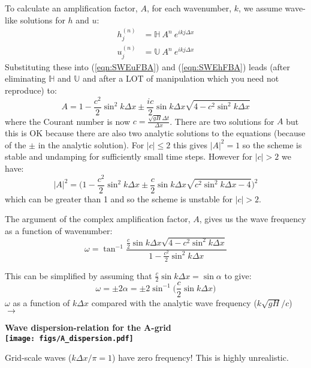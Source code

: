 To calculate an amplification factor, $A$, for each wavenumber, $k$, we assume wave-like solutions for $h$ and $u$:
\begin{align}
h_j^{(n)} &= \mathbb{H}~ A^n~ e^{ikj\Delta x}\\
u_j^{(n)} &= \mathbb{U}~ A^n~ e^{ikj\Delta x}
\end{align}
Substituting these into (\ref{eqn:SWEuFBA}) and (\ref{eqn:SWEhFBA}) leads (after eliminating $\mathbb{H}$ and $\mathbb{U}$ and after a LOT of manipulation which you need not reproduce) to:
\begin{equation}
A = 1 - \frac{c^2}{2}\sin^2 k\Delta x \pm \frac{ic}{2}\sin k\Delta x \sqrt{4 - c^2 \sin^2 k\Delta x}
\end{equation}
where the Courant number is now $c=\frac{\sqrt{gH}\Delta t}{\Delta x}$. There are two solutions for $A$ but this is OK because there are also two analytic solutions to the equations (because of the $\pm$ in the analytic solution). For $|c|\le 2$ this gives $|A|^2=1$ so the scheme is stable and undamping for sufficiently small time steps. However for $|c|>2$ we have:
\begin{equation*}
|A|^2 = \biggl(
1 - \frac{c^2}{2}\sin^2 k\Delta x \pm \frac{c}{2}\sin k\Delta x \sqrt{c^2 \sin^2 k\Delta x - 4}\biggr)^2
\end{equation*}
which can be greater than 1 and so the scheme is unstable for $|c|>2$.

The argument of the complex amplification factor, $A$, gives us the wave frequency as a function of wavenumber:
\begin{equation}
\omega = \tan^{-1}\frac{\frac{c}{2}\sin k\Delta x \sqrt{4 - c^2 \sin^2 k\Delta x}}{1 - \frac{c^2}{2}\sin^2 k\Delta x}
\end{equation}
\begin{minipage}{0.5\linewidth}
This can be simplified by assuming that $\frac{c}{2}\sin k\Delta x = \sin\alpha$ to give:
\begin{equation}
\omega = \pm 2\alpha = \pm 2\sin^{-1}\bigl(\frac{c}{2}\sin k\Delta x\bigr)
\end{equation}
$\omega$ as a function of $k\Delta x$  compared with the analytic wave frequency ($k\sqrt{gH}/c$) $\rightarrow$
\end{minipage}
\hfill
\begin{minipage}{0.48\linewidth}
\bf Wave dispersion-relation for the A-grid\\
\texttt{[image: figs/A\_dispersion.pdf]}
\end{minipage}
Grid-scale waves ($k\Delta x/\pi=1$) have zero frequency! This is highly unrealistic.


